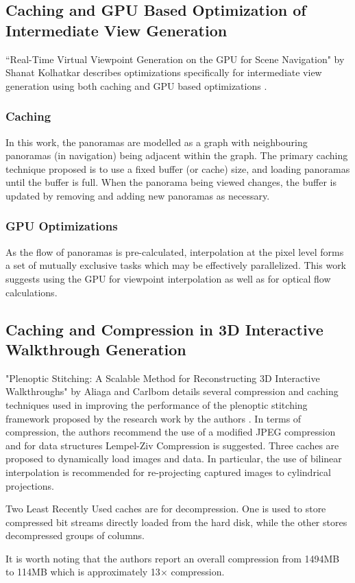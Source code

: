 \subsection{Caching and GPU Based Optimization of Intermediate View Generation}
``Real-Time Virtual Viewpoint Generation on the GPU for Scene Navigation" by Shanat Kolhatkar describes optimizations specifically for intermediate view generation using both caching and GPU based optimizations \cite{Kolhatkar2010}.  

\subsubsection{Caching}
In this work, the panoramas are modelled as a graph with neighbouring panoramas (in navigation) being adjacent within the graph. The primary caching technique proposed is to use a fixed buffer (or cache) size, and loading panoramas until the buffer is full. When the panorama being viewed changes, the buffer is updated by removing and adding new panoramas as necessary. 

\subsubsection{GPU Optimizations}
As the flow of panoramas is pre-calculated, interpolation at the pixel level forms a set of mutually exclusive tasks which may be effectively parallelized. This work suggests using the GPU for viewpoint interpolation as well as for optical flow calculations. 

\subsection{Caching and Compression in 3D Interactive Walkthrough Generation}
"Plenoptic Stitching: A Scalable Method for Reconstructing 3D Interactive Walkthroughs" by Aliaga and Carlbom details several compression and caching techniques used in improving the performance of the plenoptic stitching framework proposed by the research work by the authors \cite{Aliaga2001}.
In terms of compression, the authors recommend the use of a modified JPEG compression \cite{wallace92} and for data structures Lempel-Ziv Compression \cite{Ziv77} is suggested. Three caches are proposed to dynamically load images and data. In particular, the use of bilinear interpolation is recommended for re-projecting captured images to cylindrical projections. 

Two Least Recently Used caches are for decompression. One is used to store compressed bit streams directly loaded from the hard disk, while the other stores decompressed groups of columns.

It is worth noting that the authors report an overall compression from 1494MB to 114MB which is approximately 13$\times$ compression.


